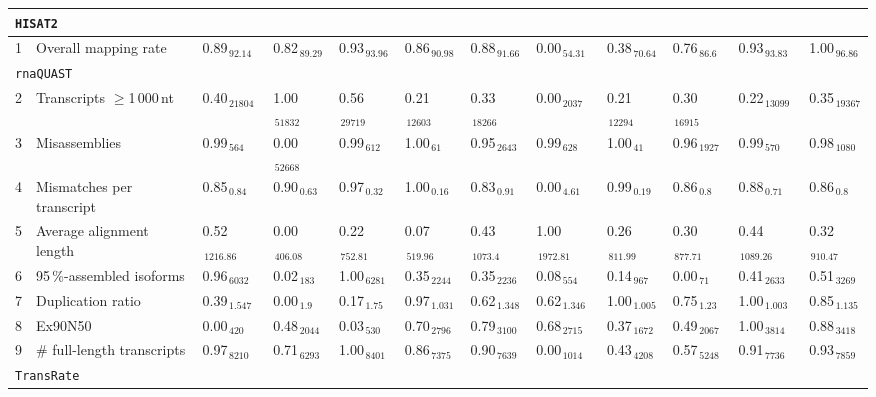 \documentclass{scrartcl}
\begin{document}
\begin{landscape}
\begin{table}
\begin{scriptsize}
\begin{tabular}{llllllllllll}
\multicolumn{11}{l}{\texttt{HISAT2}}\\ 
\midrule
1 & Overall mapping rate  & 0.89$_{\,92.14}$ & 0.82$_{\,89.29}$ & 0.93$_{\,93.96}$ & 0.86$_{\,90.98}$ & 0.88$_{\,91.66}$ & 0.00$_{\,54.31}$ & 0.38$_{\,70.64}$ & 0.76$_{\,86.6}$ & 0.93$_{\,93.83}$ & 1.00$_{\,96.86}$ \\\midrule
\multicolumn{11}{l}{\texttt{rnaQUAST}}\\ 
\midrule
2 & Transcripts $\geq$1\,000\,nt  & 0.40$_{\,21804}$ & 1.00$_{\,51832}$ & 0.56$_{\,29719}$ & 0.21$_{\,12603}$ & 0.33$_{\,18266}$ & 0.00$_{\,2037}$ & 0.21$_{\,12294}$ & 0.30$_{\,16915}$ & 0.22$_{\,13099}$ & 0.35$_{\,19367}$ \\3 & Misassemblies  & 0.99$_{\,564}$ & 0.00$_{\,52668}$ & 0.99$_{\,612}$ & 1.00$_{\,61}$ & 0.95$_{\,2643}$ & 0.99$_{\,628}$ & 1.00$_{\,41}$ & 0.96$_{\,1927}$ & 0.99$_{\,570}$ & 0.98$_{\,1080}$ \\4 & Mismatches per transcript  & 0.85$_{\,0.84}$ & 0.90$_{\,0.63}$ & 0.97$_{\,0.32}$ & 1.00$_{\,0.16}$ & 0.83$_{\,0.91}$ & 0.00$_{\,4.61}$ & 0.99$_{\,0.19}$ & 0.86$_{\,0.8}$ & 0.88$_{\,0.71}$ & 0.86$_{\,0.8}$ \\5 & Average alignment length  & 0.52$_{\,1216.86}$ & 0.00$_{\,406.08}$ & 0.22$_{\,752.81}$ & 0.07$_{\,519.96}$ & 0.43$_{\,1073.4}$ & 1.00$_{\,1972.81}$ & 0.26$_{\,811.99}$ & 0.30$_{\,877.71}$ & 0.44$_{\,1089.26}$ & 0.32$_{\,910.47}$ \\6 & 95\,\%-assembled isoforms  & 0.96$_{\,6032}$ & 0.02$_{\,183}$ & 1.00$_{\,6281}$ & 0.35$_{\,2244}$ & 0.35$_{\,2236}$ & 0.08$_{\,554}$ & 0.14$_{\,967}$ & 0.00$_{\,71}$ & 0.41$_{\,2633}$ & 0.51$_{\,3269}$ \\7 & Duplication ratio  & 0.39$_{\,1.547}$ & 0.00$_{\,1.9}$ & 0.17$_{\,1.75}$ & 0.97$_{\,1.031}$ & 0.62$_{\,1.348}$ & 0.62$_{\,1.346}$ & 1.00$_{\,1.005}$ & 0.75$_{\,1.23}$ & 1.00$_{\,1.003}$ & 0.85$_{\,1.135}$ \\\midrule
8 & Ex90N50  & 0.00$_{\,420}$ & 0.48$_{\,2044}$ & 0.03$_{\,530}$ & 0.70$_{\,2796}$ & 0.79$_{\,3100}$ & 0.68$_{\,2715}$ & 0.37$_{\,1672}$ & 0.49$_{\,2067}$ & 1.00$_{\,3814}$ & 0.88$_{\,3418}$ \\9 & \# full-length transcripts  & 0.97$_{\,8210}$ & 0.71$_{\,6293}$ & 1.00$_{\,8401}$ & 0.86$_{\,7375}$ & 0.90$_{\,7639}$ & 0.00$_{\,1014}$ & 0.43$_{\,4208}$ & 0.57$_{\,5248}$ & 0.91$_{\,7736}$ & 0.93$_{\,7859}$ \\\midrule
\multicolumn{11}{l}{\texttt{TransRate}}\\ 
\midrule

\end{tabular}
\end{scriptsize}
\end{table}
\end{landscape}
\end{document}
